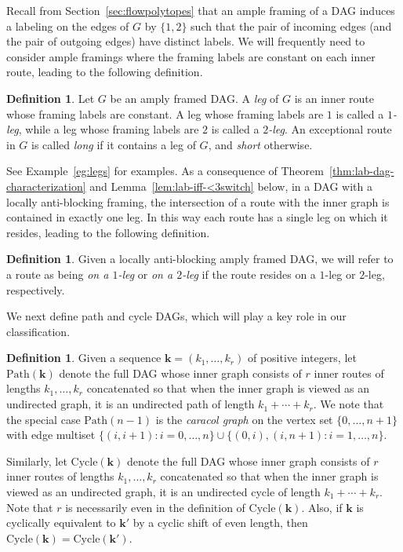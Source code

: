 \documentclass[12pt]{amsart}
\theoremstyle{definition}
\newtheorem{definition}[theorem]{Definition}
\newcommand{\defn}[1]{\emph{\color{blue} #1}}
\newcommand\bk{\mathbf{k}}
\newcommand\Path{\mathrm{Path}}
\newcommand\Cycle{\mathrm{Cycle}}
\begin{document}
Recall from Section~\ref{sec:flowpolytopes} that an ample framing of a DAG induces a labeling on the edges of $G$ by $\{1,2\}$ such that the pair of incoming edges (and the pair of outgoing edges) have distinct labels.
We will frequently need to consider ample framings where the framing labels are constant on each inner route, leading to the following definition.

\begin{definition}
Let $G$ be an amply framed DAG. 
A \defn{leg} of $G$ is an inner route whose framing labels are constant.
A leg whose framing labels are $1$ is called a \defn{$1$-leg}, while a leg whose framing labels are $2$ is called a \defn{$2$-leg}.
An exceptional route in $G$ is called \defn{long} if it contains a leg of $G$, and \defn{short} otherwise.
\end{definition}

See Example~\ref{eg:legs} for examples.
As a consequence of Theorem~\ref{thm:lab-dag-characterization}  and Lemma~\ref{lem:lab-iff-<3switch} below, in a DAG with a locally anti-blocking framing, the intersection of a route with the inner graph is contained in exactly one leg. 
In this way each route has a single leg on which it resides, leading to the following definition.

\begin{definition}
Given a locally anti-blocking amply framed DAG, we will refer to a route as being \defn{on a $1$-leg} or \defn{on a $2$-leg} if the route resides on a $1$-leg or $2$-leg, respectively.
\end{definition}

We next define path and cycle DAGs, which will play a key role in our classification.

\begin{definition}\label{def:dag-labeling}
Given a sequence $\bk = (k_1, \dots, k_r)$ of positive integers, let \defn{$\Path(\bk)$} denote the full DAG whose inner graph consists of $r$ inner routes of lengths $k_1,\ldots, k_r$ concatenated so that when the inner graph is viewed as an undirected graph, it is an undirected path of length $k_1+\cdots +k_r$.
We note that the special case $\Path(n-1)$ is the \defn{caracol graph} on the vertex set $\{0,\ldots, n+1\}$ with edge multiset $\{(i,i+1) : i=0,\ldots, n \} \cup \{(0,i), (i,n+1)  : i=1,\ldots, n \}$.

Similarly, let \defn{$\Cycle(\bk)$} denote the full DAG whose inner graph consists of $r$ inner routes of lengths $k_1,\ldots, k_r$ concatenated so that when the inner graph is viewed as an undirected graph, it is an undirected cycle of length $k_1+\cdots + k_r$.
Note that $r$ is necessarily even in the definition of $\Cycle(\bk)$.
Also, if $\bk$ is cyclically equivalent to $\bk'$ by a cyclic shift of even length, then $\Cycle(\bk) = \Cycle(\bk')$.
\end{definition}
\end{document}
